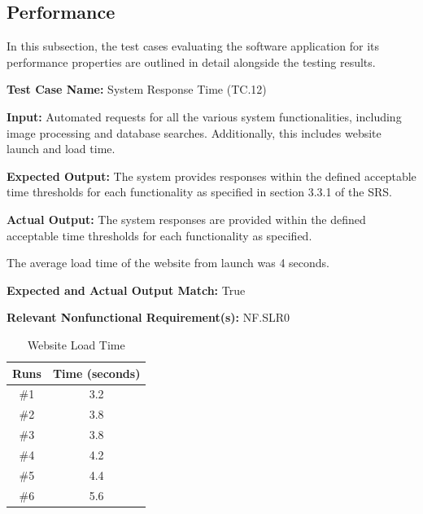 \documentclass[12pt, titlepage]{article}
\begin{document}
\subsection{Performance}
In this subsection, the test cases evaluating the software application for its performance properties are outlined in detail alongside the testing results. \\

\begin{mdframed}[linewidth=0.5mm]
  \textbf{Test Case Name:} System Response Time (TC.12) \par
  \textbf{Input:} Automated requests for all the various system functionalities, including image processing and database searches. Additionally, this includes website launch and load time. \par
  \textbf{Expected Output:} The system provides responses within the defined acceptable time thresholds for each functionality as specified in section 3.3.1 of the SRS. \par
  \textbf{Actual Output:} The system responses are provided within the defined acceptable time thresholds for each functionality as specified.
  
  The average load time of the website from launch was 4 seconds. 
  \par
  \textbf{Expected and Actual Output Match:} True \par
  \textbf{Relevant Nonfunctional Requirement(s):} NF.SLR0

  \begin{table}[H]
  \centering
    \label{tab:websiteLoadTime}
    \begin{tabular}{|c|c|}
    \hline
       Runs  & Time (seconds) \\
       \hline
        \#1 & 3.2  \\
        \#2 & 3.8  \\
        \#3 & 3.8  \\
        \#4 & 4.2  \\
        \#5 & 4.4  \\
        \#6 & 5.6 \\
        \hline
    \end{tabular}
    \caption{Website Load Time}
  \end{table}


\end{mdframed}
\end{document}
